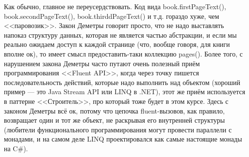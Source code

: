 \documentclass[a5paper]{article}
\begin{document}
Как обычно, главное не переусердствовать. Код вида book.firstPageText(), book.secondPageText(), book.thirddPageText() и т.д. гораздо хуже, чем <<паровозик>>. Закон Деметры говорит просто, что не надо выставлять напоказ структуру данных, которая не является частью абстракции, и если мы реально ожидаем доступ к каждой странице (что, вообще говоря, для книги вполне ок), то имеет смысл предоставить-таки коллекцию pages(). Более того, с нарушением закона Деметры часто путают очень полезный приём программирования <<Fluent API>>, когда через точку пишется последовательность действий, которые надо выполнить над объектом (хороший пример --- это Java Stream API или LINQ в .NET), этот же приём используется в паттерне <<Строитель>>, про который тоже будет в этом курсе. Здесь с законом Деметры всё ок, потому что цепочка fluent-вызовов, как правило, возвращает один и тот же объект, не раскрывая его внутренней структуры (любители функционального программирования могут провести параллели с монадами, и на самом деле LINQ проектировался как самые настоящие монады на C\#).
\end{document}

